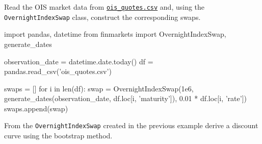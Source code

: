 \begin{question}
Read the OIS market data from \href{https://raw.githubusercontent.com/matteosan1/finance_course/develop/libro/input_files/ois_quotes.csv}{\texttt{ois\_quotes.csv}} and, using the \texttt{OvernightIndexSwap} class, construct the corresponding swaps.
\end{question}

\cprotEnv\begin{solution}

\begin{ipython}
import pandas, datetime
from finmarkets import OvernightIndexSwap, generate_dates

observation_date = datetime.date.today()
df = pandas.read_csv('ois_quotes.csv')

swaps = []
for i in len(df):
    swap = OvernightIndexSwap(1e6,
                              generate_dates(observation_date,
                                             df.loc[i, 'maturity']),
                              0.01 * df.loc[i, 'rate'])
	swaps.append(swap)
\end{ipython}
\end{solution}

\begin{question}
From the \texttt{OvernightIndexSwap} created in the previous example derive a discount curve using the bootstrap method.
\end{question}

